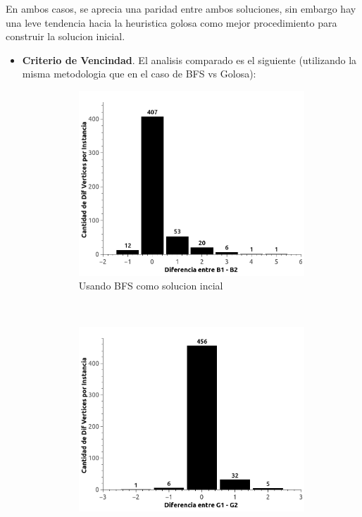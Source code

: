 En ambos casos, se aprecia una paridad entre ambos soluciones, sin embargo hay una leve tendencia hacia la heuristica golosa como mejor procedimiento para construir la solucion inicial.

\begin{itemize}
	\item \textbf{Criterio de Vencindad}. El analisis comparado es el siguiente (utilizando la misma metodologia que en el caso de BFS vs Golosa):
    
    \begin{figure}[H]
        \centering
        \begin{subfigure}[b]{0.5\textwidth}
                \includegraphics[width=\textwidth]{imagenes/ejer4-B1vsB2.jpg}
                \caption{Usando BFS como solucion incial}
        \end{subfigure}%
        ~ %
        \begin{subfigure}[b]{0.5\textwidth}
                \includegraphics[width=\textwidth]{imagenes/ejer4-G1vsG2.jpg}

\end{subfigure}
\end{figure}
\end{itemize}
